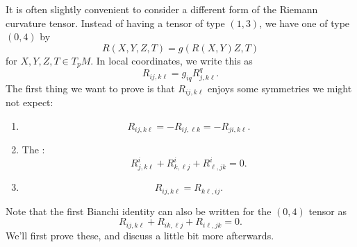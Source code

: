 \documentclass[a4paper]{article}
\begin{document}
It is often slightly convenient to consider a different form of the Riemann curvature tensor. Instead of having a tensor of type $(1, 3)$, we have one of type $(0, 4)$ by
\[
  R(X, Y, Z, T) = g(R(X, Y)Z, T)
\]
for $X, Y, Z, T \in T_p M$. In local coordinates, we write this as
\[
  R_{ij, k\ell} = g_{iq} R^q_{j, k\ell}.
\]
The first thing we want to prove is that $R_{ij, k\ell}$ enjoys some symmetries we might not expect:
\begin{prop}\leavevmode
  \begin{enumerate}
    \item
      \[
        R_{ij, k\ell} = - R_{ij, \ell k} = - R_{ji, k\ell}.
      \]
    \item The :
      \[
        R^i_{j, k \ell} + R^i_{k, \ell j} + R^i_{\ell, jk} = 0.
      \]
    \item
      \[
        R_{ij, k\ell} = R_{k\ell, ij}.
      \]
  \end{enumerate}
\end{prop}
Note that the first Bianchi identity can also be written for the $(0, 4)$ tensor as
\[
  R_{ij, k\ell} + R_{ik, \ell j} + R_{i\ell, jk} = 0.
\]
We'll first prove these, and discuss a little bit more afterwards.
\end{document}
